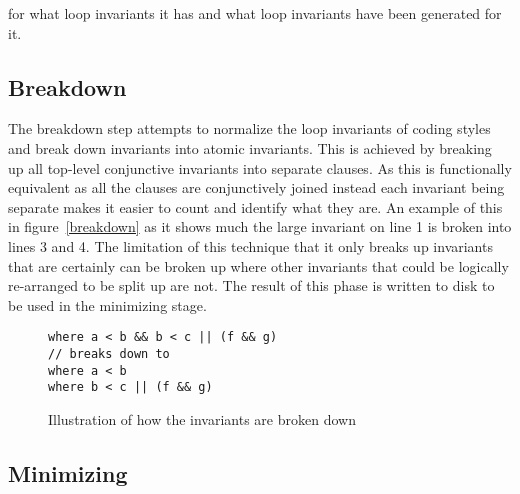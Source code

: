 for what loop invariants
it has and what loop invariants have been generated for it.

\subsection{Breakdown}

The breakdown step attempts to normalize the loop invariants of coding styles
and break down invariants into atomic invariants.
This is achieved by breaking up all top-level conjunctive invariants into
separate  clauses.
As this is functionally equivalent as all the  clauses are
conjunctively joined instead each invariant being separate makes it easier to count
and identify what they are.
An example of this in figure~\ref{breakdown} as it shows much the large
invariant on line 1 is broken into lines 3 and 4.
The limitation of this technique that it only breaks up invariants that are
certainly can be broken up where other invariants that could be logically
re-arranged to be split up are not.
The result of this phase is written to disk to be used in the minimizing stage.

\begin{figure}[ht]
\begin{lstlisting}
where a < b && b < c || (f && g)
// breaks down to
where a < b
where b < c || (f && g)
\end{lstlisting}
\caption{Illustration of how the invariants are broken down}
\label{lst:breakdown}
\end{figure}


\subsection{Minimizing}

